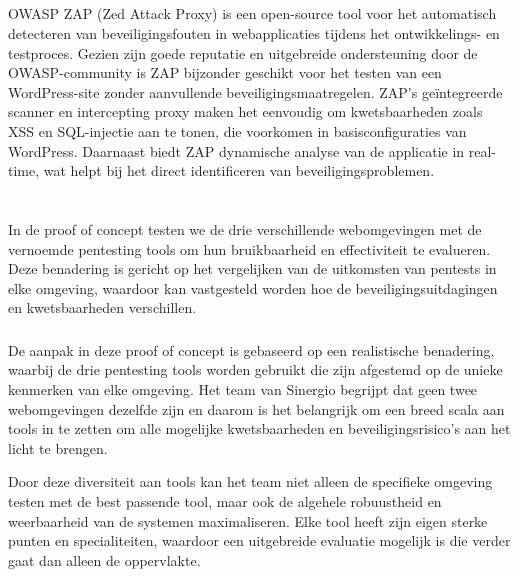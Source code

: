 \subsection{}
OWASP ZAP (Zed Attack Proxy) is een open-source tool voor het automatisch detecteren van beveiligingsfouten 
in webapplicaties tijdens het ontwikkelings- en testproces. Gezien zijn goede reputatie en uitgebreide 
ondersteuning door de OWASP-community is ZAP bijzonder geschikt voor het testen van een 
WordPress-site zonder aanvullende beveiligingsmaatregelen. ZAP's geïntegreerde scanner en 
intercepting proxy maken het eenvoudig om kwetsbaarheden zoals XSS en SQL-injectie aan te 
tonen, die voorkomen in basisconfiguraties van WordPress. Daarnaast biedt ZAP dynamische 
analyse van de applicatie in real-time, wat helpt bij het direct identificeren van beveiligingsproblemen.


\section{}

In de proof of concept testen we de drie verschillende webomgevingen met de vernoemde pentesting tools om hun bruikbaarheid en effectiviteit te evalueren. 
Deze benadering is gericht op het vergelijken van de uitkomsten van pentests in elke omgeving, waardoor kan vastgesteld worden hoe de 
beveiligingsuitdagingen en kwetsbaarheden verschillen.

\subsubsection{}
De aanpak in deze proof of concept is gebaseerd op een realistische benadering, waarbij de drie pentesting tools worden gebruikt die zijn afgestemd 
op de unieke kenmerken van elke omgeving. Het team van Sinergio begrijpt dat geen twee webomgevingen dezelfde zijn en daarom is het belangrijk om een breed scala 
aan tools in te zetten om alle mogelijke kwetsbaarheden en beveiligingsrisico's aan het licht te brengen.

Door deze diversiteit aan tools kan het team niet alleen de specifieke omgeving testen met de best passende tool, maar ook de algehele robuustheid en 
weerbaarheid van de systemen maximaliseren. Elke tool heeft zijn eigen sterke punten en specialiteiten, waardoor een uitgebreide evaluatie mogelijk 
is die verder gaat dan alleen de oppervlakte.

